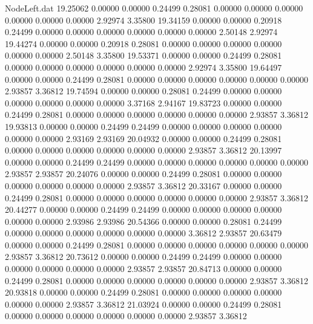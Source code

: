 \begin{filecontents}{NodeLeft.dat}
  19.25062    0.00000    0.00000     0.24499    0.28081    0.00000    0.00000    0.00000    0.00000    0.00000    0.00000    2.92974    3.35800
  19.34159    0.00000    0.00000     0.20918    0.24499    0.00000    0.00000    0.00000    0.00000    0.00000    0.00000    2.50148    2.92974
  19.44274    0.00000    0.00000     0.20918    0.28081    0.00000    0.00000    0.00000    0.00000    0.00000    0.00000    2.50148    3.35800
  19.53371    0.00000    0.00000     0.24499    0.28081    0.00000    0.00000    0.00000    0.00000    0.00000    0.00000    2.92974    3.35800
  19.64497    0.00000    0.00000     0.24499    0.28081    0.00000    0.00000    0.00000    0.00000    0.00000    0.00000    2.93857    3.36812
  19.74594    0.00000    0.00000     0.28081    0.24499    0.00000    0.00000    0.00000    0.00000    0.00000    0.00000    3.37168    2.94167
  19.83723    0.00000    0.00000     0.24499    0.28081    0.00000    0.00000    0.00000    0.00000    0.00000    0.00000    2.93857    3.36812
  19.93813    0.00000    0.00000     0.24499    0.24499    0.00000    0.00000    0.00000    0.00000    0.00000    0.00000    2.93169    2.93169
  20.04932    0.00000    0.00000     0.24499    0.28081    0.00000    0.00000    0.00000    0.00000    0.00000    0.00000    2.93857    3.36812
  20.13997    0.00000    0.00000     0.24499    0.24499    0.00000    0.00000    0.00000    0.00000    0.00000    0.00000    2.93857    2.93857
  20.24076    0.00000    0.00000     0.24499    0.28081    0.00000    0.00000    0.00000    0.00000    0.00000    0.00000    2.93857    3.36812
  20.33167    0.00000    0.00000     0.24499    0.28081    0.00000    0.00000    0.00000    0.00000    0.00000    0.00000    2.93857    3.36812
  20.44277    0.00000    0.00000     0.24499    0.24499    0.00000    0.00000    0.00000    0.00000    0.00000    0.00000    2.93986    2.93986
  20.54366    0.00000    0.00000     0.28081    0.24499    0.00000    0.00000    0.00000    0.00000    0.00000    0.00000    3.36812    2.93857
  20.63479    0.00000    0.00000     0.24499    0.28081    0.00000    0.00000    0.00000    0.00000    0.00000    0.00000    2.93857    3.36812
  20.73612    0.00000    0.00000     0.24499    0.24499    0.00000    0.00000    0.00000    0.00000    0.00000    0.00000    2.93857    2.93857
  20.84713    0.00000    0.00000     0.24499    0.28081    0.00000    0.00000    0.00000    0.00000    0.00000    0.00000    2.93857    3.36812
  20.93818    0.00000    0.00000     0.24499    0.28081    0.00000    0.00000    0.00000    0.00000    0.00000    0.00000    2.93857    3.36812
  21.03924    0.00000    0.00000     0.24499    0.28081    0.00000    0.00000    0.00000    0.00000    0.00000    0.00000    2.93857    3.36812

\end{filecontents}
